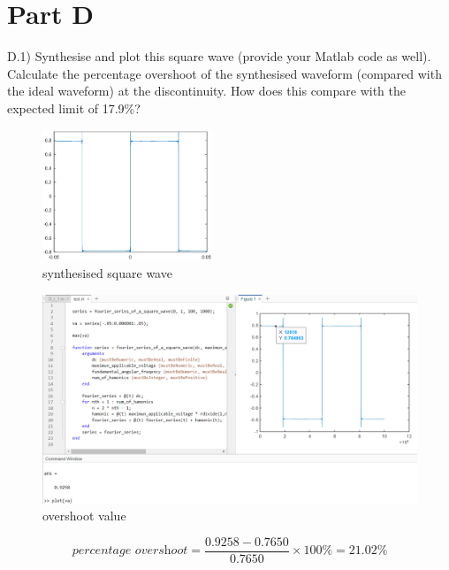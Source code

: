 \section*{Part D}

\begin{tcolorbox}
  D.1) Synthesise and plot this square wave (provide your Matlab code as well). Calculate the percentage overshoot of the synthesised waveform (compared with the ideal waveform) at the discontinuity. How does this compare with the expected limit of 17.9\%?
\end{tcolorbox}



\begin{figure}[htbp]
  \centering
  \includegraphics [width=2in]{matlab/fig/D_r_1.eps}
  \caption{synthesised square wave}    
  \label{fig:D_r_1}
\end{figure}

\begin{figure}[htbp]
  \centering
  \includegraphics [width=\textwidth]{matlab/fig/D_r_1_2.png}
  \caption{overshoot value}    
  \label{fig:D_r_1_2}
\end{figure}

\[ \textit{percentage overshoot} = \frac{0.9258 - 0.7650}{0.7650} \times 100\% = 21.02 \% \]

